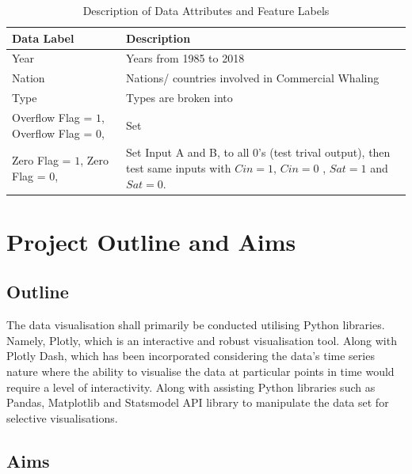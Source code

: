 \documentclass[12pt,a4paper]{article}
\begin{document}
\begin{table}[H]
\centering
\begin{tabular}{| m{5cm} |m{10cm}|}
\hline
 \textbf{Data Label} & \textbf{Description}\\ 
 \hline
    Year
  & 
  Years from 1985 to 2018
\\ 
 \hline
 Nation
  &   Nations/ countries involved in Commercial Whaling \\ 
 \hline
 Type
 & Types are broken into \\ 
 \hline
  Overflow Flag = $1$, 
  Overflow Flag = $0$, 
 & Set\\ 
 \hline
  Zero Flag = $1$, 
  Zero Flag = $0$, 
 & Set Input A and B, to all 0's (test trival output), then test same inputs with $Cin = 1$, $Cin = 0$ , $Sat = 1$ and $Sat = 0$.\\
   \hline
\end{tabular}
 \caption{\label{tab:table2} Description of Data Attributes and Feature Labels}
\end{table}


\newpage


\section{Project Outline and Aims}

    \subsection{Outline}
    The data visualisation shall primarily be conducted utilising Python libraries. Namely, Plotly, which is an interactive and robust visualisation tool. Along with Plotly Dash, which has been incorporated considering the data's time series nature where the ability to  visualise the data at particular points in time would require a level of interactivity. Along with assisting Python libraries such as Pandas, Matplotlib and Statsmodel API library to manipulate the data set for selective visualisations. 

    \subsection{Aims}
    
\end{document}
